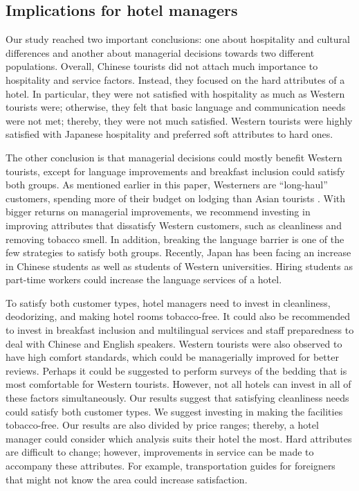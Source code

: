 \documentclass[smallextended,natbib]{svjour3}       %
\begin{document}
  \subsection{Implications for hotel managers}\label{disc:implications}

    Our study reached two important conclusions: one about hospitality and cultural differences and another about managerial decisions towards two different populations. Overall, Chinese tourists did not attach much importance to hospitality and service factors. Instead, they focused on the hard attributes of a hotel. In particular, they were not satisfied with hospitality as much as Western tourists were; otherwise, they felt that basic language and communication needs were not met; thereby, they were not much satisfied. Western tourists were highly satisfied with Japanese hospitality and preferred soft attributes to hard ones. 

    The other conclusion is that managerial decisions could mostly benefit Western tourists, except for language improvements and breakfast inclusion could satisfy both groups. As mentioned earlier in this paper, Westerners are ``long-haul'' customers, spending more of their budget on lodging than Asian tourists \cite[][]{choi2000}. With bigger returns on managerial improvements, we recommend investing in improving attributes that dissatisfy Western customers, such as cleanliness and removing tobacco smell. In addition, breaking the language barrier is one of the few strategies to satisfy both groups. Recently, Japan has been facing an increase in Chinese students as well as students of Western universities. Hiring students as part-time workers could increase the language services of a hotel.

    To satisfy both customer types, hotel managers need to invest in cleanliness, deodorizing, and making hotel rooms tobacco-free. It could also be recommended to invest in breakfast inclusion and multilingual services and staff preparedness to deal with Chinese and English speakers. Western tourists were also observed to have high comfort standards, which could be managerially improved for better reviews. Perhaps it could be suggested to perform surveys of the bedding that is most comfortable for Western tourists. However, not all hotels can invest in all of these factors simultaneously. Our results suggest that satisfying cleanliness needs could satisfy both customer types. We suggest investing in making the facilities tobacco-free. Our results are also divided by price ranges; thereby, a hotel manager could consider which analysis suits their hotel the most. Hard attributes are difficult to change; however, improvements in service can be made to accompany these attributes. For example, transportation guides for foreigners that might not know the area could increase satisfaction.
\end{document}
